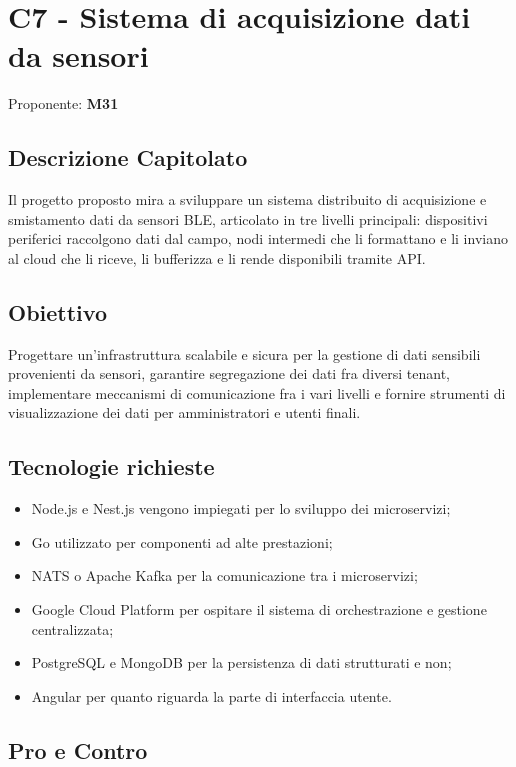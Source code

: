 \documentclass[a4paper,12pt]{article}
\begin{document}
\section{C7 - Sistema di acquisizione dati da sensori}{
    Proponente: \textbf{M31}
    \subsection*{Descrizione Capitolato}{
        Il progetto proposto mira a sviluppare un sistema distribuito di acquisizione e smistamento dati da sensori BLE, articolato in tre livelli principali: dispositivi periferici raccolgono dati dal campo, nodi intermedi che li formattano e li inviano al cloud che li riceve, li bufferizza e li rende disponibili tramite API.
    }

    \subsection*{Obiettivo}{
        Progettare un'infrastruttura scalabile e sicura per la gestione di dati sensibili provenienti da sensori, garantire segregazione dei dati fra diversi tenant, implementare meccanismi di comunicazione fra i vari livelli e fornire strumenti di visualizzazione dei dati per amministratori e utenti finali.
    }

    \subsection*{Tecnologie richieste}{
        \begin{itemize}
            \item Node.js e Nest.js vengono impiegati per lo sviluppo dei microservizi;
            \item Go utilizzato per componenti ad alte prestazioni;
            \item NATS o Apache Kafka per la comunicazione tra i microservizi;
            \item Google Cloud Platform per ospitare il sistema di orchestrazione e gestione centralizzata;
            \item PostgreSQL e MongoDB per la persistenza di dati strutturati e non;
            \item Angular per quanto riguarda la parte di interfaccia utente.
        \end{itemize}
    }

    \subsection*{Pro e Contro}{

}}
\end{document}
